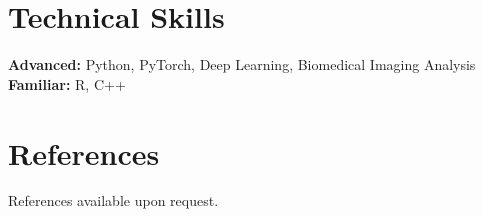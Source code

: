 \documentclass[11pt, letterpaper]{article}
\begin{document}
\section{Technical Skills}

\textbf{Advanced:} Python, PyTorch, Deep Learning, Biomedical Imaging Analysis\\
\textbf{Familiar:} R, C++

\section{References}

References available upon request.
\end{document}
